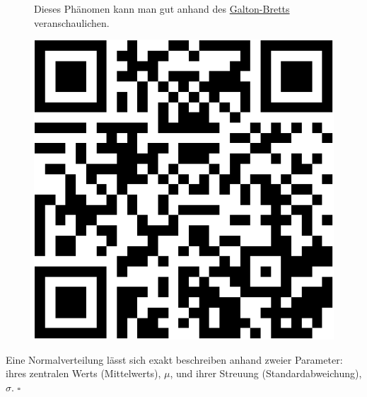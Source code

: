 \documentclass[
  letterpaper,
]{scrbook}
\theoremstyle{definition}
\theoremstyle{definition}
\theoremstyle{definition}
\theoremstyle{remark}
\begin{document}
\begin{figure}

\begin{minipage}{0.80\linewidth}
Dieses Phänomen kann man gut anhand des
\href{https://www.youtube.com/watch?v=3m4bxse2JEQ}{Galton-Bretts}
veranschaulichen.\end{minipage}%
%
\begin{minipage}{0.20\linewidth}

\begin{center}
\includegraphics[width=0.75\linewidth,height=\textheight,keepaspectratio]{040-verbildlichen_files/figure-pdf/unnamed-chunk-17-1.pdf}
\end{center}

\end{minipage}%

\end{figure}%

\begin{tcolorbox}[enhanced jigsaw, left=2mm, toptitle=1mm, toprule=.15mm, rightrule=.15mm, leftrule=.75mm, breakable, colbacktitle=quarto-callout-important-color!10!white, colback=white, coltitle=black, bottomtitle=1mm, opacityback=0, title=\textcolor{quarto-callout-important-color}{\faExclamation}\hspace{0.5em}{Parameter der Normalverteilung}, colframe=quarto-callout-important-color-frame, arc=.35mm, opacitybacktitle=0.6, bottomrule=.15mm, titlerule=0mm]

Eine Normalverteilung lässt sich exakt beschreiben anhand zweier
Parameter: ihres zentralen Werts (Mittelwerts), \(\mu\), und ihrer
Streuung (Standardabweichung), \(\sigma\). \(\square\)

\end{tcolorbox}
\end{document}

